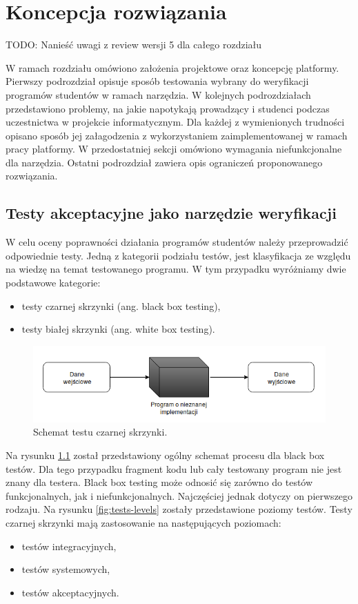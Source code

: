 \chapter{Koncepcja rozwiązania}
\label{chapter:requirements}

TODO: Nanieść uwagi z review wersji 5 dla całego rozdziału

W ramach rozdziału omówiono założenia projektowe oraz koncepcję platformy.
Pierwszy podrozdział opisuje sposób testowania wybrany do weryfikacji programów studentów w ramach narzędzia.
W kolejnych podrozdziałach przedstawiono problemy, na jakie napotykają prowadzący i studenci podczas uczestnictwa w projekcie informatycznym.
Dla każdej z wymienionych trudności opisano sposób jej załagodzenia z wykorzystaniem zaimplementowanej w ramach pracy platformy.
W przedostatniej sekcji omówiono wymagania niefunkcjonalne dla narzędzia.
Ostatni podrozdział zawiera opis ograniczeń proponowanego rozwiązania.

\section{Testy akceptacyjne jako narzędzie weryfikacji}

W celu oceny poprawności działania programów studentów należy przeprowadzić odpowiednie testy.
Jedną z kategorii podziału testów, jest klasyfikacja ze względu na wiedzę na temat testowanego programu.
W tym przypadku wyróżniamy dwie podstawowe kategorie:
\begin{itemize}
    \item testy czarnej skrzynki (ang. black box testing),
    \item testy białej skrzynki (ang. white box testing).
\end{itemize}

\begin{figure}[h]
    \centering
    \includegraphics[width = 13cm]{chapter02/black-box.png}
    \caption{Schemat testu czarnej skrzynki.}
    \label{fig:black-box}
\end{figure}

Na rysunku \ref{fig:black-box} został przedstawiony ogólny schemat procesu dla black box testów.
Dla tego przypadku fragment kodu lub cały testowany program nie jest znany dla testera.
Black box testing może odnosić się zarówno do testów funkcjonalnych, jak i niefunkcjonalnych.
Najczęściej jednak dotyczy on pierwszego rodzaju.
Na rysunku \ref{fig:tests-levels} zostały przedstawione poziomy testów.
Testy czarnej skrzynki mają zastosowanie na następujących poziomach:
\begin{itemize}
    \item testów integracyjnych,
    \item testów systemowych,
    \item testów akceptacyjnych.
\end{itemize}

